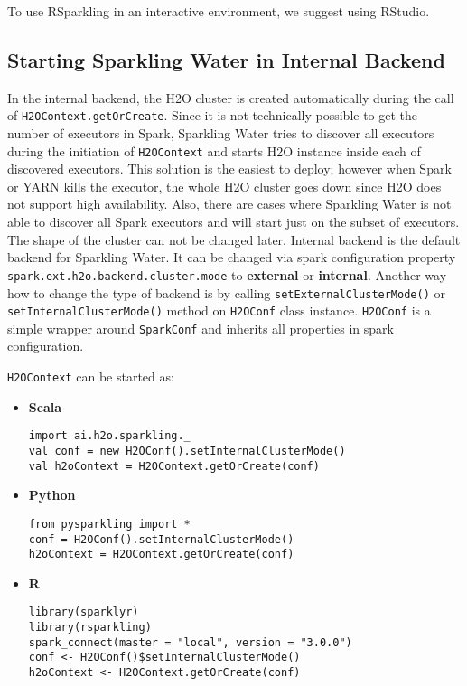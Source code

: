 To use RSparkling in an interactive environment, we suggest using RStudio.

\subsection{Starting Sparkling Water in Internal Backend}

In the internal backend, the H2O cluster is created automatically during the call of \texttt{H2OContext.getOrCreate}. Since
it is not technically possible to get the number of executors in Spark, Sparkling Water tries to discover all executors
during the initiation of \texttt{H2OContext} and starts H2O instance inside each of discovered executors. This solution
is the easiest to deploy; however when Spark or YARN kills the executor, the whole H2O cluster goes down since H2O
does not support high availability. Also, there are cases where Sparkling Water is not able to discover all Spark
executors and will start just on the subset of executors. The shape of the cluster can not be changed later.
Internal backend is the default backend for Sparkling Water. It can be changed via spark configuration property
\texttt{spark.ext.h2o.backend.cluster.mode} to \textbf{external} or \textbf{internal}. Another way how to change the
type of backend is by calling \texttt{setExternalClusterMode()} or \texttt{setInternalClusterMode()} method
on \texttt{H2OConf} class instance. \texttt{H2OConf} is a simple wrapper around \texttt{SparkConf} and inherits all
properties in spark configuration.

\texttt{H2OContext} can be started as:

\begin{itemize}
    \item \textbf{Scala} \begin{lstlisting}[style=Scala]
import ai.h2o.sparkling._
val conf = new H2OConf().setInternalClusterMode()
val h2oContext = H2OContext.getOrCreate(conf)
    \end{lstlisting}
    \item \textbf{Python} \begin{lstlisting}[style=Python]
from pysparkling import *
conf = H2OConf().setInternalClusterMode()
h2oContext = H2OContext.getOrCreate(conf)
    \end{lstlisting}
    \item \textbf{R} \begin{lstlisting}[style=R]
library(sparklyr)
library(rsparkling)
spark_connect(master = "local", version = "3.0.0")
conf <- H2OConf()$setInternalClusterMode()
h2oContext <- H2OContext.getOrCreate(conf)
    \end{lstlisting}
\end{itemize}

